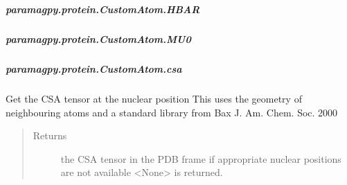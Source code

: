 \documentclass[a4paper,10pt,english,openany,oneside]{sphinxmanual}
\begin{document}
\begin{fulllineitems}
\begin{fulllineitems}
\begin{savenotes}
\begin{longtable}{}
\\
\hline
\end{longtable}\sphinxatlongtableend\end{savenotes}


\subparagraph{paramagpy.protein.CustomAtom.HBAR}
\label{\detokenize{reference/generated/paramagpy.protein.CustomAtom.HBAR:paramagpy-protein-customatom-hbar}}\label{\detokenize{reference/generated/paramagpy.protein.CustomAtom.HBAR::doc}}

\begin{fulllineitems}
\label{\detokenize{reference/generated/paramagpy.protein.CustomAtom.HBAR:paramagpy.protein.CustomAtom.HBAR}}
\end{fulllineitems}



\subparagraph{paramagpy.protein.CustomAtom.MU0}
\label{\detokenize{reference/generated/paramagpy.protein.CustomAtom.MU0:paramagpy-protein-customatom-mu0}}\label{\detokenize{reference/generated/paramagpy.protein.CustomAtom.MU0::doc}}

\begin{fulllineitems}
\label{\detokenize{reference/generated/paramagpy.protein.CustomAtom.MU0:paramagpy.protein.CustomAtom.MU0}}
\end{fulllineitems}



\subparagraph{paramagpy.protein.CustomAtom.csa}
\label{\detokenize{reference/generated/paramagpy.protein.CustomAtom.csa:paramagpy-protein-customatom-csa}}\label{\detokenize{reference/generated/paramagpy.protein.CustomAtom.csa::doc}}

\begin{fulllineitems}
\label{\detokenize{reference/generated/paramagpy.protein.CustomAtom.csa:paramagpy.protein.CustomAtom.csa}}
Get the CSA tensor at the nuclear position
This uses the geometry of neighbouring atoms
and a standard library from Bax J. Am. Chem. Soc. 2000
\begin{quote}\begin{description}
\item[{Returns}] \leavevmode
{} \textendash{} the CSA tensor in the PDB frame
if appropriate nuclear positions are not
available \textless{}None\textgreater{} is returned.


\end{description}
\end{quote}
\end{fulllineitems}
\end{fulllineitems}
\end{fulllineitems}
\end{document}
